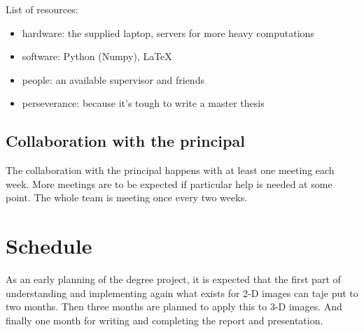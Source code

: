 \documentclass[12pt]{article}
\begin{document}
List of resources: \\
\begin{itemize}
 \item hardware: the supplied laptop, servers for more heavy computations
 \item software: Python (Numpy), \LaTeX
 \item people: an available supervisor and friends
 \item perseverance: because it's tough to write a master thesis
\end{itemize}

\subsection*{Collaboration with the principal}

The collaboration with the principal happens with at least one meeting each week.
More meetings are to be expected if particular help is needed at some point.
The whole team is meeting once every two weeks.

\section*{Schedule}

As an early planning of the degree project, it is expected that the first part of understanding and implementing again what exists for 2-D images can taje put to two months.
Then three months are planned to apply this to 3-D images.
And finally one month for writing and completing the report and presentation.
\end{document}
